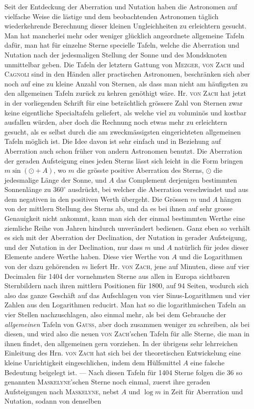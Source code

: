Seit der Entdeckung der Aberration und Nutation haben die Astronomen auf vielfache Weise die lästige und dem beobachtenden Astronomen täglich wiederkehrende Berechnung dieser kleinen Ungleichheiten zu erleichtern gesucht. Man hat mancherlei mehr oder weniger glücklich angeordnete allgemeine Tafeln dafür, man hat für einzelne Sterne specielle Tafeln, welche die Aberration und Nutation nach der jedesmaligen Stellung der Sonne und des Mondsknoten unmittelbar geben. Die Tafeln der letztern Gattung von \textsc{Mezger}, \textsc{von Zach} und \textsc{Cagnoli} sind in den Händen aller practischen Astronomen, beschränken sich aber noch auf eine zu kleine Anzahl von Sternen, als dass man nicht am häufigsten zu den allgemeinen Tafeln zurück zu kehren genöthigt wäre. Hr. \textsc{von Zach} hat jetzt in der vorliegenden Schrift für eine beträchtlich grössere Zahl von Sternen zwar keine eigentliche Specialtafeln geliefert, als welche viel zu voluminös und kostbar ausfallen würden, aber doch die Rechnung noch etwas mehr zu erleichtern gesucht, als es selbst durch die am zweckmässigsten eingerichteten allgemeinen Tafeln möglich ist. Die Idee davon ist sehr einfach und in Beziehung auf Aberration auch schon früher von andern Astronomen benutzt. Die Aberration der geraden Aufsteigung eines jeden Sterns lässt sich leicht in die Form bringen $m\sin(\odot+A)$, wo $m$ die grösste positive Aberration des Sterns, $\odot$ die jedesmalige Länge der Sonne, und $A$ das Complement derjenigen bestimmten Sonnenlänge zu $360^\circ$ ausdrückt, bei welcher die Aberration verschwindet und aus dem negativen in den positiven Werth übergeht. Die Grössen $m$ und $A$ hängen von der mittlern Stellung des Sterns ab, und da es bei ihnen auf sehr grosse Genauigkeit nicht ankommt, kann man sich der einmal bestimmten Werthe eine ziemliche Reihe von Jahren hindurch unverändert bedienen. Ganz eben so verhält es sich mit der Aberration der Declination, der Nutation in gerader Aufsteigung, und der Nutation in der Declination, nur dass $m$ und $A$ natürlich für jedes dieser Elemente andere Werthe haben. Diese vier Werthe von $A$ und die Logarithmen von der dazu gehörenden $m$ liefert Hr. \textsc{von Zach}, jene auf Minuten, diese auf vier Decimalen für 1404 der vornehmsten Sterne aus allen in Europa sichtbaren Sternbildern nach ihren mittlern Positionen für 1800, auf 94 Seiten, wodurch sich also das ganze Geschäft auf das Aufschlagen von vier Sinus-Logarithmen und vier Zahlen aus den Logarithmen reducirt. Man hat so die logarithmischen Tafeln an vier Stellen nachzuschlagen, also einmal mehr, als bei dem Gebrauche der \emph{allgemeinen} Tafeln von \textsc{Gauss}, aber doch zusammen weniger zu schreiben, als bei diesen, und wird also die neuen \textsc{von Zach}'schen Tafeln für alle Sterne, die man in ihnen findet, den allgemeinen gern vorziehen. In der übrigens sehr lehrreichen Einleitung des Hrn. \textsc{von Zach} hat sich bei der theoretischen Entwickelung eine kleine Unrichtigkeit eingeschlichen, indem dem Hülfsmittel $A$ eine falsche Bedeutung beigelegt ist. --- Nach diesen Tafeln für 1404 Sterne folgen die 36 so genannten \textsc{Maskelyne}'schen Sterne noch einmal, zuerst ihre geraden Aufsteigungen nach \textsc{Maskelyne}, nebst $A$ und $\log m$ in Zeit für Aberration und Nutation, sodann von denselben 